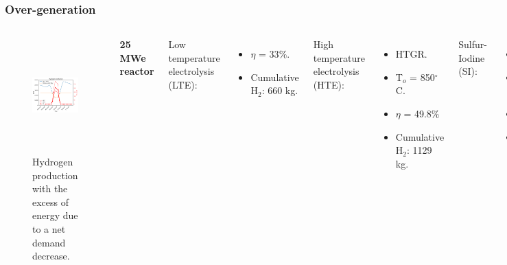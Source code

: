 \begin{frame}
\frametitle{Over-generation}
\begin{columns}
    \column[t]{5.5cm}
	\begin{figure}[htbp!]
		\begin{center}
			\includegraphics[height=4.4cm]{images/uiuc-hydro2B}
		\end{center}
		\caption{Hydrogen production with the excess of energy due to a net demand decrease.}
	\end{figure}

    \column[t]{5.5cm}
    \textbf{25 MWe reactor} \vspace{0.2cm}

    Low temperature electrolysis (LTE):
    \begin{itemize}
 		\item $\eta$ = 33$\%$.
 		\item Cumulative H$_2$: 660 kg.
 	\end{itemize}

    High temperature electrolysis (HTE):
    \begin{itemize}
 		\item HTGR.
 		\item T$_o$ = 850$^\circ$C.
 		\item $\eta$ = 49.8$\%$
 		\item Cumulative H$_2$: 1129 kg.
 	\end{itemize}

    Sulfur-Iodine (SI):
    \begin{itemize}
 		\item HTGR.
 		\item T$_o$ = 850$^\circ$C.
 		\item $\eta$ = 49.8$\%$
 		\item Cumulative H$_2$: 815 kg.
 	\end{itemize}
\end{columns}
\end{frame}